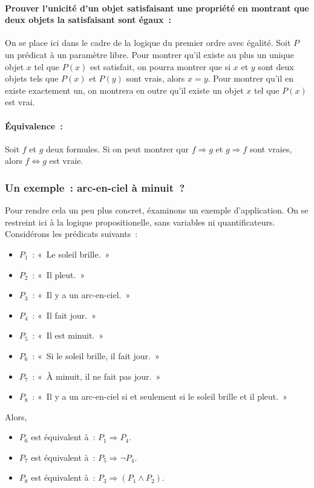 \paragraph{Prouver l'unicité d'un objet satisfaisant une propriété en montrant que deux objets la satisfaisant sont égaux :} 
    On se place ici dans le cadre de la logique du premier ordre avec égalité.
    Soit $P$ un prédicat à un paramètre libre. 
    Pour montrer qu'il existe au plus un unique objet $x$ tel que $P(x)$ est satisfait, on pourra montrer que si $x$ et $y$ sont deux objets tels que $P(x)$ et $P(y)$ sont vrais, alors $x = y$.
    Pour montrer qu'il en existe exactement un, on montrera en outre qu'il existe un objet $x$ tel que $P(x)$ est vrai.

\medskip

\paragraph{Équivalence :} 
    Soit $f$ et $g$ deux formules. 
    Si on peut montrer qur $f \Rightarrow g$ et $g \Rightarrow f$ sont vraies, alors $f \Leftrightarrow g$ est vraie.

\subsubsection{Un exemple : arc-en-ciel à minuit ?}

Pour rendre cela un peu plus concret, éxaminons un exemple d'application. 
On se restreint ici à la logique propositionelle, sans variables ni quantificateurs. 
Considérons les prédicats suivants : 
\begin{itemize}[nosep]
    \item $P_1$ : « Le soleil brille. »
    \item $P_2$ : « Il pleut. »
    \item $P_3$ : « Il y a un arc-en-ciel. »
    \item $P_4$ : « Il fait jour. »
    \item $P_5$ : « Il est minuit. »
    \item $P_6$ : « Si le soleil brille, il fait jour. »
    \item $P_7$ : « À minuit, il ne fait pas jour. »
    \item $P_8$ : « Il y a un arc-en-ciel si et seulement si le soleil brille et il pleut. »
\end{itemize}
Alors, 
\begin{itemize}[nosep]
    \item $P_6$ est équivalent à : $P_1 \Rightarrow P_4$.
    \item $P_7$ est équivalent à : $P_5 \Rightarrow \neg P_4$.
    \item $P_8$ est équivalent à : $P_3 \Rightarrow (P_1 \wedge P_2)$.
\end{itemize}

